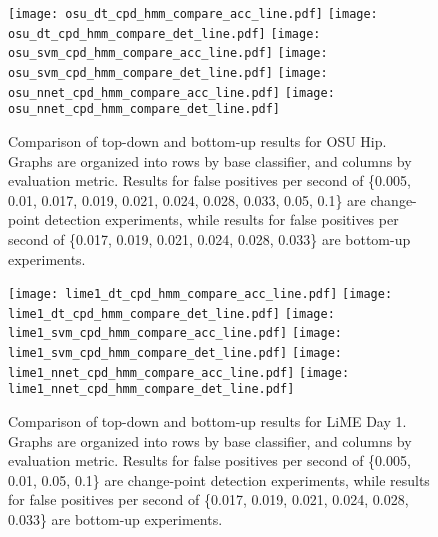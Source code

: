 \begin{figure}[h]
 \centering
 \texttt{[image: osu\_dt\_cpd\_hmm\_compare\_acc\_line.pdf]} \hspace{1em}\vspace{1em}
 \texttt{[image: osu\_dt\_cpd\_hmm\_compare\_det\_line.pdf]} 
 \texttt{[image: osu\_svm\_cpd\_hmm\_compare\_acc\_line.pdf]} \hspace{1em}\vspace{1em}
 \texttt{[image: osu\_svm\_cpd\_hmm\_compare\_det\_line.pdf]}
 \texttt{[image: osu\_nnet\_cpd\_hmm\_compare\_acc\_line.pdf]} \hspace{1em}
 \texttt{[image: osu\_nnet\_cpd\_hmm\_compare\_det\_line.pdf]}
 \caption{Comparison of top-down and bottom-up results for OSU Hip.
  Graphs are organized into rows by base classifier, and columns by evaluation
  metric. Results for false positives per second of \{0.005, 0.01, 0.017, 0.019, 0.021, 0.024, 0.028, 0.033, 0.05, 0.1\} are change-point
  detection experiments, while results for false positives per second of
  \{0.017, 0.019, 0.021, 0.024, 0.028, 0.033\} are bottom-up experiments.}
 \label{fig:osu_compare_cpd_hmm}
\end{figure}

\begin{figure}[h]
 \centering
 \texttt{[image: lime1\_dt\_cpd\_hmm\_compare\_acc\_line.pdf]} \hspace{1em}\vspace{1em}
 \texttt{[image: lime1\_dt\_cpd\_hmm\_compare\_det\_line.pdf]} 
 \texttt{[image: lime1\_svm\_cpd\_hmm\_compare\_acc\_line.pdf]} \hspace{1em}\vspace{1em}
 \texttt{[image: lime1\_svm\_cpd\_hmm\_compare\_det\_line.pdf]}
 \texttt{[image: lime1\_nnet\_cpd\_hmm\_compare\_acc\_line.pdf]} \hspace{1em}
 \texttt{[image: lime1\_nnet\_cpd\_hmm\_compare\_det\_line.pdf]}
 \caption{Comparison of top-down and bottom-up results for LiME Day 1.
  Graphs are organized into rows by base classifier, and columns by evaluation
  metric. Results for false positives per second of \{0.005, 0.01, 0.05, 0.1\} are change-point
  detection experiments, while results for false positives per second of
  \{0.017, 0.019, 0.021, 0.024, 0.028, 0.033\} are bottom-up experiments.}
 \label{fig:lime1_compare_cpd_hmm}
\end{figure}

